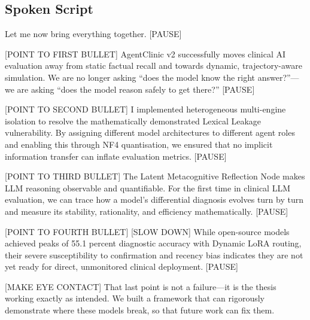 \subsection*{Spoken Script}
\begin{spokenbox}
 Let me now bring everything together. [PAUSE]

[POINT TO FIRST BULLET] AgentClinic v2 successfully moves clinical AI evaluation away from static factual recall and towards dynamic, trajectory-aware simulation. We are no longer asking ``does the model know the right answer?''---we are asking ``does the model reason safely to get there?'' [PAUSE]

[POINT TO SECOND BULLET] I implemented heterogeneous multi-engine isolation to resolve the mathematically demonstrated Lexical Leakage vulnerability. By assigning different model architectures to different agent roles and enabling this through NF4 quantisation, we ensured that no implicit information transfer can inflate evaluation metrics. [PAUSE]

[POINT TO THIRD BULLET] The Latent Metacognitive Reflection Node makes LLM reasoning observable and quantifiable. For the first time in clinical LLM evaluation, we can trace how a model's differential diagnosis evolves turn by turn and measure its stability, rationality, and efficiency mathematically. [PAUSE]

[POINT TO FOURTH BULLET] [SLOW DOWN] While open-source models achieved peaks of 55.1 percent diagnostic accuracy with Dynamic LoRA routing, their severe susceptibility to confirmation and recency bias indicates they are not yet ready for direct, unmonitored clinical deployment. [PAUSE]

[MAKE EYE CONTACT] That last point is not a failure---it is the thesis working exactly as intended. We built a framework that can rigorously demonstrate where these models break, so that future work can fix them.
\end{spokenbox}


